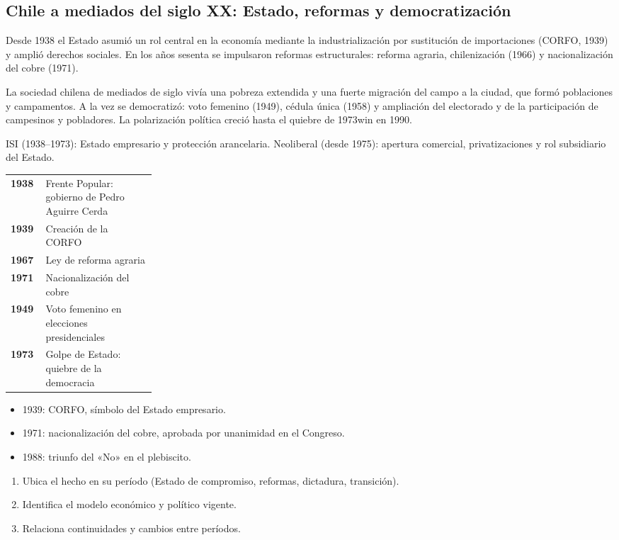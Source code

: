 \documentclass[10pt,a4paper,twocolumn]{article}
\makeatletter
\renewcommand{\arraystretch}{1.18}
\newenvironment{lineatiempo}[1][Línea de tiempo]
  {\begin{tcolorbox}[paes, acento=zinc700, title={#1}]\small\renewcommand{\arraystretch}{1.25}%
   \begin{tabular}{@{}>{\leavevmode\sffamily\bfseries\color{zinc700}}p{0.24\linewidth}p{\dimexpr0.76\linewidth-2\tabcolsep\relax}@{}}}
  {\end{tabular}\end{tcolorbox}}
\makeatother
\begin{document}
\subsection{Chile a mediados del siglo XX: Estado, reformas y democratización}

Desde 1938 el Estado asumió un rol central en la economía mediante la industrialización por sustitución de importaciones (CORFO, 1939) y amplió derechos sociales. En los años sesenta se impulsaron reformas estructurales: reforma agraria, chilenización (1966) y nacionalización del cobre (1971).

La sociedad chilena de mediados de siglo vivía una pobreza extendida y una fuerte migración del campo a la ciudad, que formó poblaciones y campamentos. A la vez se democratizó: voto femenino (1949), cédula única (1958) y ampliación del electorado y de la participación de campesinos y pobladores. La polarización política creció hasta el quiebre de 1973win en 1990.

\begin{definicion}
ISI (1938–1973): Estado empresario y protección arancelaria. Neoliberal (desde 1975): apertura comercial, privatizaciones y rol subsidiario del Estado.
\end{definicion}

\begin{lineatiempo}
1938 & Frente Popular: gobierno de Pedro Aguirre Cerda \\
1939 & Creación de la CORFO \\
1967 & Ley de reforma agraria \\
1971 & Nacionalización del cobre \\
1949 & Voto femenino en elecciones presidenciales \\
1973 & Golpe de Estado: quiebre de la democracia \\
\end{lineatiempo}

\begin{ideasclave}
\begin{itemize}
  \item 1939: CORFO, símbolo del Estado empresario.
  \item 1971: nacionalización del cobre, aprobada por unanimidad en el Congreso.
  \item 1988: triunfo del «No» en el plebiscito.
\end{itemize}
\end{ideasclave}

\begin{metodo}
\begin{enumerate}
  \item Ubica el hecho en su período (Estado de compromiso, reformas, dictadura, transición).
  \item Identifica el modelo económico y político vigente.
  \item Relaciona continuidades y cambios entre períodos.
\end{enumerate}
\end{metodo}
\end{document}
